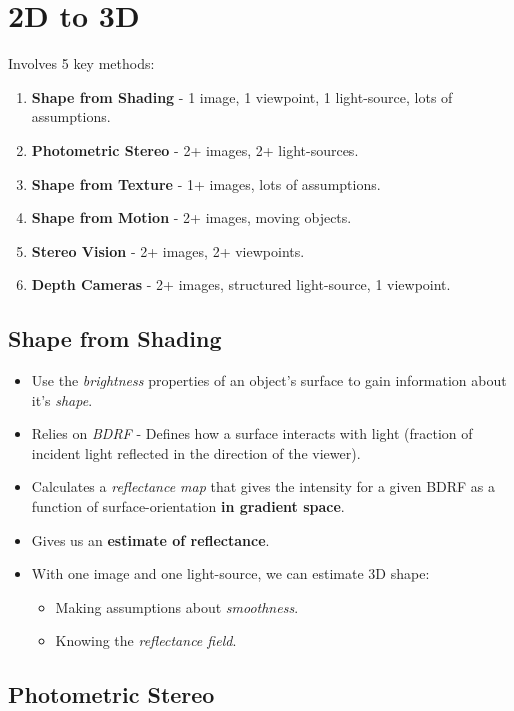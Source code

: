 \documentclass[english, 10pt]{article}
\begin{document}
\section{2D to 3D}

Involves 5 key methods:

\begin{enumerate}
\item \textbf{Shape from Shading} - 1 image, 1 viewpoint, 1 light-source, lots of assumptions.
\item \textbf{Photometric Stereo} - 2+ images, 2+ light-sources.
\item \textbf{Shape from Texture} - 1+ images, lots of assumptions.
\item \textbf{Shape from Motion} - 2+ images, moving objects.
\item \textbf{Stereo Vision} - 2+ images, 2+ viewpoints.
\item \textbf{Depth Cameras} - 2+ images, structured light-source, 1 viewpoint.
\end{enumerate}

\subsection{Shape from Shading}

\begin{itemize}
\item Use the \textit{brightness} properties of an object's surface to gain information about it's \textit{shape}. 
\item Relies on \textit{BDRF} - Defines how a surface interacts with light (fraction of incident light reflected in the direction of the viewer). 
\item Calculates a \textit{reflectance map} that gives the intensity for a given BDRF as a function of surface-orientation \textbf{in gradient space}.
\item Gives us an \textbf{estimate of reflectance}.
\item With one image and one light-source, we can estimate 3D shape:
\begin{itemize}
\item Making assumptions about \textit{smoothness}.
\item Knowing the \textit{reflectance field}.
\end{itemize}
\end{itemize}

\subsection{Photometric Stereo}
\end{document}
